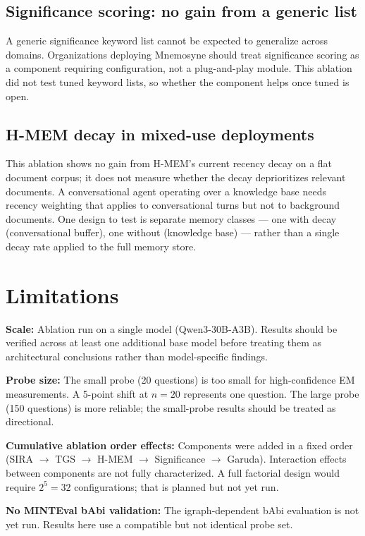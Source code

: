 \documentclass[11pt,a4paper]{article}
\begin{document}
\subsection{Significance scoring: no gain from a generic list}

A generic significance keyword list cannot be expected to generalize across domains. Organizations deploying Mnemosyne should treat significance scoring as a component requiring configuration, not a plug-and-play module. This ablation did not test tuned keyword lists, so whether the component helps once tuned is open.

\subsection{H-MEM decay in mixed-use deployments}

This ablation shows no gain from H-MEM's current recency decay on a flat document corpus; it does not measure whether the decay deprioritizes relevant documents. A conversational agent operating over a knowledge base needs recency weighting that applies to conversational turns but not to background documents. One design to test is separate memory classes --- one with decay (conversational buffer), one without (knowledge base) --- rather than a single decay rate applied to the full memory store.

\section{Limitations}

\textbf{Scale:} Ablation run on a single model (Qwen3-30B-A3B). Results should be verified across at least one additional base model before treating them as architectural conclusions rather than model-specific findings.

\textbf{Probe size:} The small probe (20 questions) is too small for high-confidence EM measurements. A 5-point shift at $n=20$ represents one question. The large probe (150 questions) is more reliable; the small-probe results should be treated as directional.

\textbf{Cumulative ablation order effects:} Components were added in a fixed order (SIRA $\rightarrow$ TGS $\rightarrow$ H-MEM $\rightarrow$ Significance $\rightarrow$ Garuda). Interaction effects between components are not fully characterized. A full factorial design would require $2^5 = 32$ configurations; that is planned but not yet run.

\textbf{No MINTEval bAbi validation:} The igraph-dependent bAbi evaluation is not yet run. Results here use a compatible but not identical probe set.
\end{document}
